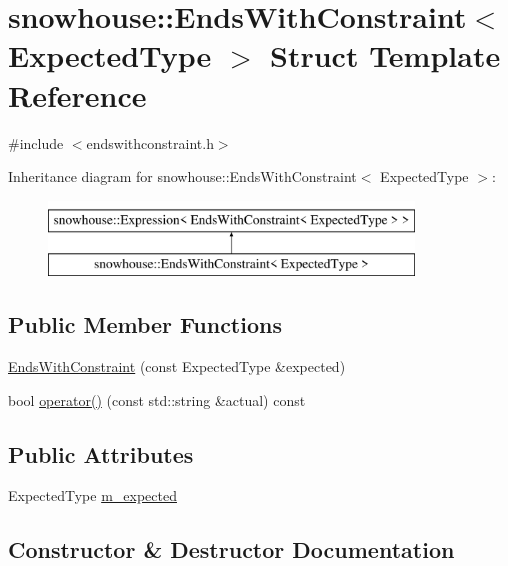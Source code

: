 \hypertarget{structsnowhouse_1_1EndsWithConstraint}{}\section{snowhouse\+::Ends\+With\+Constraint$<$ Expected\+Type $>$ Struct Template Reference}
\label{structsnowhouse_1_1EndsWithConstraint}


{\ttfamily \#include $<$endswithconstraint.\+h$>$}

Inheritance diagram for snowhouse\+::Ends\+With\+Constraint$<$ Expected\+Type $>$\+:\begin{figure}[H]
\begin{center}
\leavevmode
\includegraphics[height=2.000000cm]{structsnowhouse_1_1EndsWithConstraint}
\end{center}
\end{figure}
\subsection*{Public Member Functions}
\begin{DoxyCompactItemize}
\item 
\mbox{\hyperlink{structsnowhouse_1_1EndsWithConstraint_aa1c8666b769ec2b9bfc124049ba83d02}{Ends\+With\+Constraint}} (const Expected\+Type \&expected)
\item 
bool \mbox{\hyperlink{structsnowhouse_1_1EndsWithConstraint_a464e1c0f6879a7b3535ffab15496fe6b}{operator()}} (const std\+::string \&actual) const
\end{DoxyCompactItemize}
\subsection*{Public Attributes}
\begin{DoxyCompactItemize}
\item 
Expected\+Type \mbox{\hyperlink{structsnowhouse_1_1EndsWithConstraint_ad8b73b6e472dee52069ca845e3c8bfc6}{m\+\_\+expected}}
\end{DoxyCompactItemize}


\subsection{Constructor \& Destructor Documentation}
\mbox{\label{structsnowhouse_1_1EndsWithConstraint_aa1c8666b769ec2b9bfc124049ba83d02}} 
